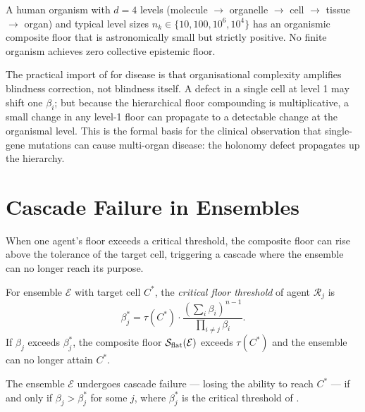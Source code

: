 \begin{corollary}
\label{cor:organismic-blindness}
A human organism with $d = 4$ levels (molecule $\to$ organelle $\to$ cell
$\to$ tissue $\to$ organ) and typical level sizes $n_k \in \{10, 100, 10^6, 10^4\}$
has an organismic composite floor that is astronomically small but strictly
positive.  No finite organism achieves zero collective epistemic floor.
\end{corollary}

\begin{remark}
\label{rem:org-compounding}
The practical import of  for disease is that
organisational complexity amplifies blindness correction, not blindness itself.
A defect in a single cell at level 1 may shift one $\beta_i$; but because the
hierarchical floor compounding is multiplicative, a small change in any
level-1 floor can propagate to a detectable change at the organismal level.
This is the formal basis for the clinical observation that single-gene mutations
can cause multi-organ disease: the holonomy defect propagates up the hierarchy.
\end{remark}

\section{Cascade Failure in Ensembles}
\label{sec:cascade-failure}

When one agent's floor exceeds a critical threshold, the composite floor can
rise above the tolerance of the target cell, triggering a cascade where the
ensemble can no longer reach its purpose.

\begin{definition}
\label{def:critical-threshold}
For ensemble $\mathcal{E}$ with target cell $C^*$, the \emph{critical floor
threshold} of agent $\mathcal{R}_j$ is
\[
  \beta_j^* = \tau(C^*) \cdot \frac{\left(\sum_i \beta_i\right)^{n-1}}
  {\prod_{i \neq j} \beta_i} .
\]
If $\beta_j$ exceeds $\beta_j^*$, the composite floor
$\mathcal{S}_{\mathrm{flat}}(\mathcal{E})$ exceeds $\tau(C^*)$ and the ensemble can no longer
attain $C^*$.
\end{definition}

\begin{theorem}
\label{thm:cascade-failure}
The ensemble $\mathcal{E}$ undergoes cascade failure — losing the ability to
reach $C^*$ — if and only if $\beta_j > \beta_j^*$ for some $j$, where
$\beta_j^*$ is the critical threshold of .
\end{theorem}

